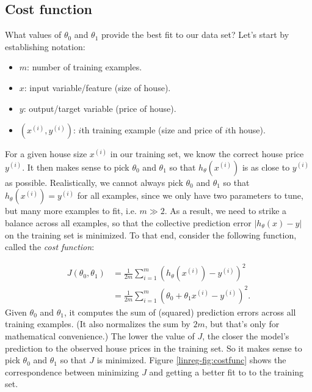 \documentclass{article}
\theoremstyle{definition}
\begin{document}
\subsection{Cost function}
What values of $\theta_0$ and $\theta_1$ provide the best fit to our data set? Let's start by establishing notation:
\begin{itemize}
    \item $m$: number of training examples.
    \item $x$: input variable/feature (size of house).
    \item $y$: output/target variable (price of house).
    \item $(x^{(i)}, y^{(i)})$: $i$th training example (size and price of $i$th house).
\end{itemize}

For a given house size $x^{(i)}$ in our training set, we know the correct house price $y^{(i)}$. It then makes sense to pick $\theta_0$ and $\theta_1$ so that $h_{\theta}(x^{(i)})$ is as close to $y^{(i)}$ as possible. Realistically, we cannot always pick $\theta_0$ and $\theta_1$ so that $h_{\theta}(x^{(i)})=y^{(i)}$ for all examples, since we only have two parameters to tune, but many more examples to fit, i.e. $m \gg 2$. As a result, we need to strike a balance across all examples, so that the collective prediction error $|h_{\theta}(x) - y|$ on the training set is minimized. To that end, consider the following function, called the \textit{cost function}:

\begin{align}
    J(\theta_0, \theta_1) &= \frac{1}{2m}\sum_{i=1}^{m}(h_{\theta}(x^{(i)}) - y^{(i)})^2
    \label{linreg-eq:costfunc}\\
    &= \frac{1}{2m}\sum_{i=1}^{m}(\theta_0 + \theta_1 x^{(i)} - y^{(i)})^2.
    \label{linreg-eq:univar-costfunc}
\end{align}
Given $\theta_0$ and $\theta_1$, it computes the sum of (squared) prediction errors across all training examples. (It also normalizes the sum by $2m$, but that's only for mathematical convenience.) The lower the value of $J$, the closer the model's prediction to the observed house prices in the training set. So it makes sense to pick $\theta_0$ and $\theta_1$ so that $J$ is minimized. Figure \ref{linreg-fig:costfunc} shows the correspondence between minimizing $J$ and getting a better fit to to the training set. 
\end{document}
